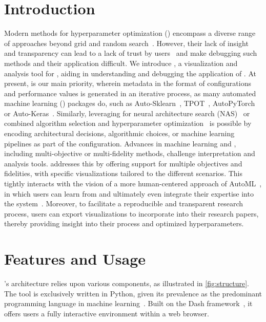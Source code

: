 \documentclass[twoside,11pt]{article}
\begin{document}
\section{Introduction}

Modern methods for hyperparameter optimization (\HPO) encompass a diverse range of approaches beyond grid and random search~\citep{turner-neuripscomp21a,bischl-dmkd23a}.
However, their lack of insight and transparency can lead to a lack of trust by users~\citep{drozdal-iui20a} and make debugging such methods and their application difficult.
We introduce \Deepcave, a visualization and analysis tool for \HPO, aiding in understanding and debugging the application of \HPO.
At present, \HPO is our main priority, wherein metadata in the format of configurations and performance values is generated in an iterative process, as many automated machine learning (\AutoML) packages do, such as Auto-Sklearn~\citep{feurer-jmlr22a}, TPOT~\citep{olson-automl19b}, AutoPyTorch~\citep{zimmer-tpami21a} or Auto-Keras~\citep{jin-sigkdd19a}.
Similarly, leveraging \Deepcave for neural architecture search (NAS)~\citep{elsken-arxiv22a} or combined algorithm selection and hyperparameter optimization~\citep{thornton-kdd13a} is possible by encoding architectural decisions, algorithmic choices, or machine learning pipelines as part of the configuration.
Advances in machine learning and \HPO, including multi-objective or multi-fidelity methods, challenge interpretation and analysis tools.
\Deepcave addresses this by offering support for multiple objectives and fidelities, with specific visualizations tailored to the different scenarios.
This tightly interacts with the vision of a more human-centered approach of AutoML~\citep{lindauer-icml24a}, in which users can learn from \HPO and ultimately even integrate their expertise into the system~\citep{hvarfner-iclr22, mallik-neurips23a}.
Moreover, to facilitate a reproducible and transparent research process, users can export visualizations to incorporate into their research papers, thereby providing insight into their \HPO process and optimized hyperparameters.

\section{Features and Usage}

\Deepcave's architecture relies upon various components, as illustrated in \autoref{fig:structure}. 
The tool is exclusively written in Python, given its prevalence as the predominant programming language in machine learning~\citep{raschka-information20}.
Built on the Dash framework~\citep{plotly-15a}, it offers users a fully interactive environment within a web browser.
\end{document}
